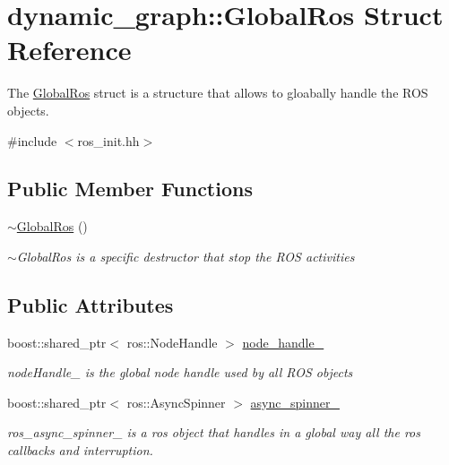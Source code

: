 \hypertarget{structdynamic__graph_1_1GlobalRos}{}\section{dynamic\+\_\+graph\+:\+:Global\+Ros Struct Reference}
\label{structdynamic__graph_1_1GlobalRos}


The \hyperlink{structdynamic__graph_1_1GlobalRos}{Global\+Ros} struct is a structure that allows to gloabally handle the R\+OS objects.  




{\ttfamily \#include $<$ros\+\_\+init.\+hh$>$}

\subsection*{Public Member Functions}
\begin{DoxyCompactItemize}
\item 
\mbox{\label{structdynamic__graph_1_1GlobalRos_ad2d7b476bb25e863b0aa7da247c2869c}} 
\hyperlink{structdynamic__graph_1_1GlobalRos_ad2d7b476bb25e863b0aa7da247c2869c}{$\sim$\+Global\+Ros} ()
\begin{DoxyCompactList}\small\item\em $\sim$\+Global\+Ros is a specific destructor that stop the R\+OS activities \end{DoxyCompactList}\end{DoxyCompactItemize}
\subsection*{Public Attributes}
\begin{DoxyCompactItemize}
\item 
\mbox{\label{structdynamic__graph_1_1GlobalRos_ac0f84eb7fdf20f2d5374d56a14c25b8d}} 
boost\+::shared\+\_\+ptr$<$ ros\+::\+Node\+Handle $>$ \hyperlink{structdynamic__graph_1_1GlobalRos_ac0f84eb7fdf20f2d5374d56a14c25b8d}{node\+\_\+handle\+\_\+}
\begin{DoxyCompactList}\small\item\em node\+Handle\+\_\+ is the global node handle used by all R\+OS objects \end{DoxyCompactList}\item 
boost\+::shared\+\_\+ptr$<$ ros\+::\+Async\+Spinner $>$ \hyperlink{structdynamic__graph_1_1GlobalRos_a9ad45d4ac3a50e943d3f2cb24f8281a3}{async\+\_\+spinner\+\_\+}
\begin{DoxyCompactList}\small\item\em ros\+\_\+async\+\_\+spinner\+\_\+ is a ros object that handles in a global way all the ros callbacks and interruption. \end{DoxyCompactList}\end{DoxyCompactItemize}


